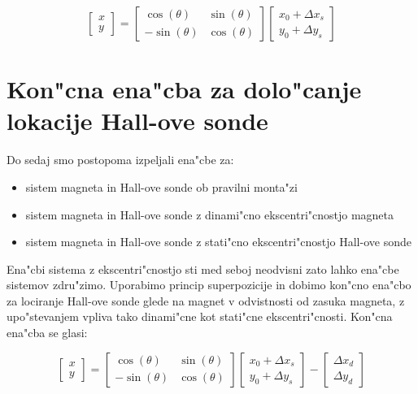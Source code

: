 \begin{equation}
\label{equ:rotacija_hall_stat}
\begin{bmatrix} x\\y \end{bmatrix}=
\begin{bmatrix} \cos(\theta)&\sin(\theta)\\-\sin(\theta)&\cos(\theta) \end{bmatrix}
\begin{bmatrix} x_0+\Delta x_s\\y_0+\Delta y_s \end{bmatrix}
\end{equation}







\section{Kon"cna ena"cba za dolo"canje lokacije Hall-ove sonde}

Do sedaj smo postopoma izpeljali ena"cbe za:
\begin{itemize}
  \item sistem magneta in Hall-ove sonde ob pravilni monta"zi
  \item sistem magneta in Hall-ove sonde z dinami"cno ekscentri"cnostjo magneta
  \item sistem magneta in Hall-ove sonde z stati"cno ekscentri"cnostjo Hall-ove sonde
\end{itemize}

Ena"cbi sistema z ekscentri"cnostjo sti med seboj neodvisni zato lahko ena"cbe sistemov zdru"zimo. Uporabimo princip superpozicije in dobimo kon"cno ena"cbo za lociranje Hall-ove sonde glede na magnet v odvistnosti od zasuka magneta, z upo"stevanjem vpliva tako dinami"cne kot stati"cne ekscentri"cnosti. Kon"cna ena"cba se glasi:

\begin{equation}
\label{equ:rotacija_hall_koncna}
\begin{bmatrix} x\\y \end{bmatrix}=
\begin{bmatrix} \cos(\theta)&\sin(\theta)\\-\sin(\theta)&\cos(\theta) \end{bmatrix}
\begin{bmatrix} x_0+\Delta x_s\\y_0+\Delta y_s \end{bmatrix}-
\begin{bmatrix} \Delta x_d\\\Delta y_d \end{bmatrix}
\end{equation}


